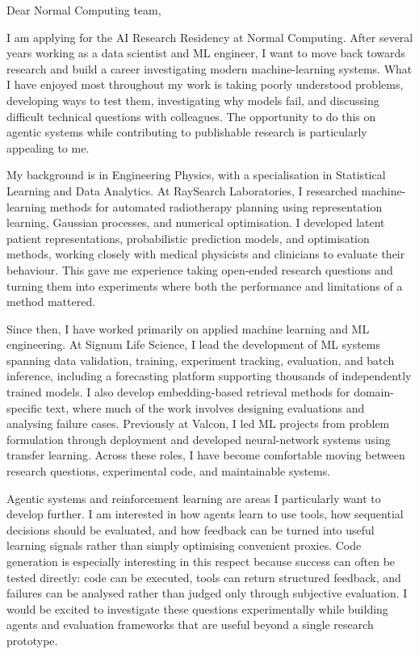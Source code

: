 \documentclass[11pt,a4paper]{moderncv}
\begin{document}
\makecvtitle

Dear Normal Computing team,

\vspace*{2em}
I am applying for the AI Research Residency at Normal Computing. After several years working as a data scientist and ML engineer, I want to move back towards research and build a career investigating modern machine-learning systems. What I have enjoyed most throughout my work is taking poorly understood problems, developing ways to test them, investigating why models fail, and discussing difficult technical questions with colleagues. The opportunity to do this on agentic systems while contributing to publishable research is particularly appealing to me.

\vspace{4pt}
\hspace*{2em}
My background is in Engineering Physics, with a specialisation in Statistical Learning and Data Analytics. At RaySearch Laboratories, I researched machine-learning methods for automated radiotherapy planning using representation learning, Gaussian processes, and numerical optimisation. I developed latent patient representations, probabilistic prediction models, and optimisation methods, working closely with medical physicists and clinicians to evaluate their behaviour. This gave me experience taking open-ended research questions and turning them into experiments where both the performance and limitations of a method mattered.

\vspace{4pt}
\hspace*{2em}
Since then, I have worked primarily on applied machine learning and ML engineering. At Signum Life Science, I lead the development of ML systems spanning data validation, training, experiment tracking, evaluation, and batch inference, including a forecasting platform supporting thousands of independently trained models. I also develop embedding-based retrieval methods for domain-specific text, where much of the work involves designing evaluations and analysing failure cases. Previously at Valcon, I led ML projects from problem formulation through deployment and developed neural-network systems using transfer learning. Across these roles, I have become comfortable moving between research questions, experimental code, and maintainable systems.

\vspace{4pt}
\hspace*{2em}
Agentic systems and reinforcement learning are areas I particularly want to develop further. I am interested in how agents learn to use tools, how sequential decisions should be evaluated, and how feedback can be turned into useful learning signals rather than simply optimising convenient proxies. Code generation is especially interesting in this respect because success can often be tested directly: code can be executed, tools can return structured feedback, and failures can be analysed rather than judged only through subjective evaluation. I would be excited to investigate these questions experimentally while building agents and evaluation frameworks that are useful beyond a single research prototype.
\end{document}
